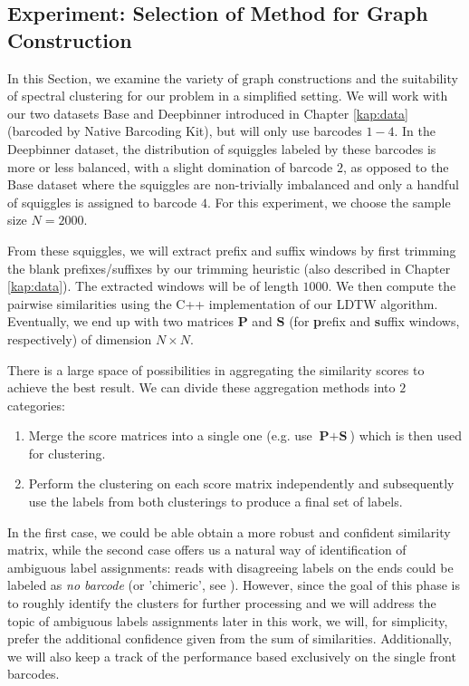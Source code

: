 \subsection{Experiment: Selection of Method for Graph Construction}
\label{sec:graph_construction_experiment}
In this Section, we examine the variety of graph constructions and the suitability of spectral clustering for our problem in a simplified setting. We will work with our two datasets Base and Deepbinner introduced in Chapter \ref{kap:data} (barcoded by Native Barcoding Kit), but will only use barcodes $1-4$. In the Deepbinner dataset, the distribution of squiggles labeled by these barcodes is more or less balanced, with a slight domination of barcode $2$, as opposed to the Base dataset where the squiggles are non-trivially imbalanced and only a handful of squiggles is assigned to barcode $4$. For this experiment, we choose the sample size $N=2000$.

From these squiggles, we will extract prefix and suffix windows by first trimming the blank prefixes/suffixes by our trimming heuristic (also described in Chapter \ref{kap:data}). The extracted windows will be of length $1000$. We then compute the pairwise similarities using the C++ implementation of our \textsc{LDTW} algorithm. Eventually, we end up with two matrices $\textbf{P}$ and $\textbf{S}$ (for \textbf{p}refix and \textbf{s}uffix windows, respectively) of dimension $N \times N$.

There is a large space of possibilities in aggregating the similarity scores to achieve the best result. We can divide these aggregation methods into $2$ categories:

\begin{enumerate}
    \item Merge the score matrices into a single one (e.g. use $\textbf{P}+\textbf{S}$) which is then used for clustering.
    \item Perform the clustering on each score matrix independently and subsequently use the labels from both clusterings to produce a final set of labels.
\end{enumerate}

In the first case, we could be able obtain a more robust and confident similarity matrix, while the second case offers us a natural way of identification of ambiguous label assignments: reads with disagreeing labels on the ends could be labeled as \textit{no barcode} (or 'chimeric', see \cite{Deepbinner}). However, since the goal of this phase is to roughly identify the clusters for further processing and we will address the topic of ambiguous labels assignments later in this work, we will, for simplicity, prefer the additional confidence given from the sum of similarities. Additionally, we will also keep a track of the performance based exclusively on the single front barcodes.

